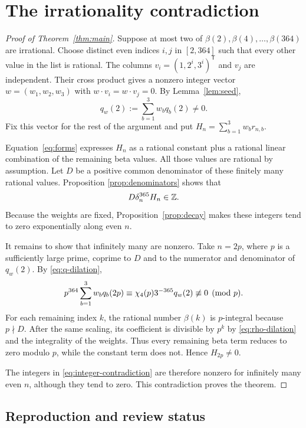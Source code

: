 \section{The irrationality contradiction}\label{sec:conclusion}

\begin{proof}[Proof of Theorem~\ref{thm:main}]
Suppose at most two of $\beta(2),\beta(4),\ldots,\beta(364)$ are
irrational. Choose distinct even indices $i,j$ in $[2,364]$ such that
every other value in the list is rational.
The columns $v_i=(1,2^i,3^i)^{\mathsf T}$ and $v_j$ are independent.
Their cross product gives a nonzero integer vector
$w=(w_1,w_2,w_3)$ with $w\cdot v_i=w\cdot v_j=0$.
By Lemma~\ref{lem:seed},
\begin{equation}\label{eq:seed-nonzero}
 q_w(2):=\sum_{b=1}^3w_bq_b(2)\ne0.
\end{equation}
Fix this vector for the rest of the argument and put
$H_n=\sum_{b=1}^3w_br_{n,b}$.

Equation~\eqref{eq:forms} expresses $H_n$ as a rational constant plus
a rational linear combination of the remaining beta values. All those
values are rational by assumption. Let $D$ be a positive common
denominator of these finitely many rational values. Proposition
\ref{prop:denominators} shows that
\begin{equation}\label{eq:integer-contradiction}
 D\delta_n^{365}H_n\in\mathbb Z.
\end{equation}
Because the weights are fixed, Proposition~\ref{prop:decay} makes these
integers tend to zero exponentially along even $n$.

It remains to show that infinitely many are nonzero. Take $n=2p$,
where $p$ is a sufficiently large prime, coprime to $D$ and to the
numerator and denominator of $q_w(2)$.
By \eqref{eq:q-dilation},
\[
 p^{364}\sum_{b=1}^3w_bq_b(2p)
       \equiv\chi_4(p)3^{-365}q_w(2)\not\equiv0\pmod p.
\]
For each remaining index $k$, the rational number $\beta(k)$ is
$p$-integral because $p\nmid D$. After the same scaling, its coefficient
is divisible by $p^k$ by \eqref{eq:rho-dilation} and the integrality of
the weights. Thus every remaining beta term reduces to zero modulo
$p$, while the constant term does not. Hence $H_{2p}\ne0$.

The integers in \eqref{eq:integer-contradiction} are therefore nonzero
for infinitely many even $n$, although they tend to zero. This
contradiction proves the theorem.
\end{proof}

\subsection{Reproduction and review status}

